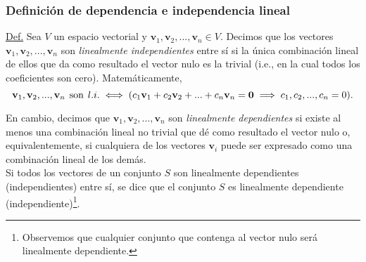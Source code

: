 \documentclass[notasLineal]{subfiles}
\begin{document}
\subsubsection*{Definición de dependencia e independencia lineal} \label{Def:Dependencia_e_independencia_lineal}

\begin{tcolorbox}

    \underline{Def.} Sea $V$ un espacio vectorial y $\mathbf{v}_1,\mathbf{v}_2,...,\mathbf{v}_n\in V$. Decimos que los vectores $\mathbf{v}_1,\mathbf{v}_2, ...,\mathbf{v}_n$ son \emph{linealmente independientes} entre sí si la única combinación lineal de ellos que da como resultado el vector nulo es la trivial (i.e., en la cual todos los coeficientes son cero). Matemáticamente, $$\mathbf{v}_1,\mathbf{v}_2, ..., \mathbf{v}_n \hspace{1.5mm} \text{son} \hspace{1.5mm} l.i. \iff (c_1\mathbf{v}_1+c_2\mathbf{v}_2+...+c_n\mathbf{v}_n=\mathbf{0}\implies c_1,c_2, ...,c_n=0).$$

    En cambio, decimos que $\mathbf{v}_1,\mathbf{v}_2, ..., \mathbf{v}_n$ son \emph{linealmente dependientes} si existe al menos una combinación lineal no trivial que dé como resultado el vector nulo o, equivalentemente, si cualquiera de los vectores $\mathbf{v}_i$ puede ser expresado como una combinación lineal de los demás. \\

    Si todos los vectores de un conjunto $S$ son linealmente dependientes (independientes) entre sí, se dice que el conjunto $S$ es linealmente dependiente (independiente)\footnote{Observemos que cualquier conjunto que contenga al vector nulo será linealmente dependiente.}.
\end{tcolorbox}
\end{document}
